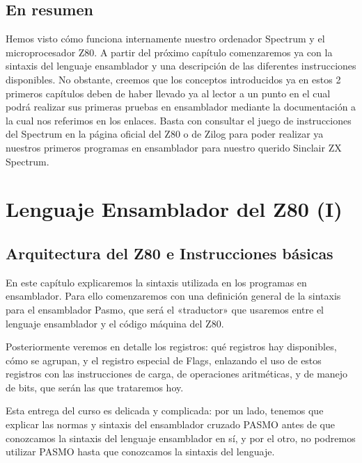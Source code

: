 \documentclass[letterpaper,10pt,spanish]{sphinxmanual}
\begin{document}
\section{En resumen}
\label{\detokenize{03_arquitectura/arquitectura:en-resumen}}
Hemos visto cómo funciona internamente nuestro ordenador Spectrum y el microprocesador Z80. A partir del próximo capítulo comenzaremos ya con la sintaxis del lenguaje ensamblador y una descripción de las diferentes instrucciones disponibles. No obstante, creemos que los conceptos introducidos ya en estos 2 primeros capítulos deben de haber llevado ya al lector a un punto en el cual podrá realizar sus primeras pruebas en ensamblador mediante la documentación a la cual nos referimos en los enlaces. Basta con consultar el juego de instrucciones del Spectrum en la página oficial del Z80 o de Zilog para poder realizar ya nuestros primeros programas en ensamblador para nuestro querido Sinclair ZX Spectrum.


\chapter{Lenguaje Ensamblador del Z80 (I)}
\label{\detokenize{04_lenguaje_ensamblador_01/lenguaje_ensamblador_01:lenguaje-ensamblador-del-z80-i}}\label{\detokenize{04_lenguaje_ensamblador_01/lenguaje_ensamblador_01::doc}}

\section{Arquitectura del Z80 e Instrucciones básicas}
\label{\detokenize{04_lenguaje_ensamblador_01/lenguaje_ensamblador_01:arquitectura-del-z80-e-instrucciones-basicas}}
En este capítulo explicaremos la sintaxis utilizada en los programas en ensamblador. Para ello comenzaremos con una definición general de la sintaxis para el ensamblador Pasmo, que será el «traductor» que usaremos entre el lenguaje ensamblador y el código máquina del Z80.

Posteriormente veremos en detalle los registros: qué registros hay disponibles, cómo se agrupan, y el registro especial de Flags, enlazando el uso de estos registros con las instrucciones de carga, de operaciones aritméticas, y de manejo de bits, que serán las que trataremos hoy.

Esta entrega del curso es delicada y complicada: por un lado, tenemos que explicar las normas y sintaxis del ensamblador cruzado PASMO antes de que conozcamos la sintaxis del lenguaje ensamblador en sí, y por el otro, no podremos utilizar PASMO hasta que conozcamos la sintaxis del lenguaje.
\end{document}
